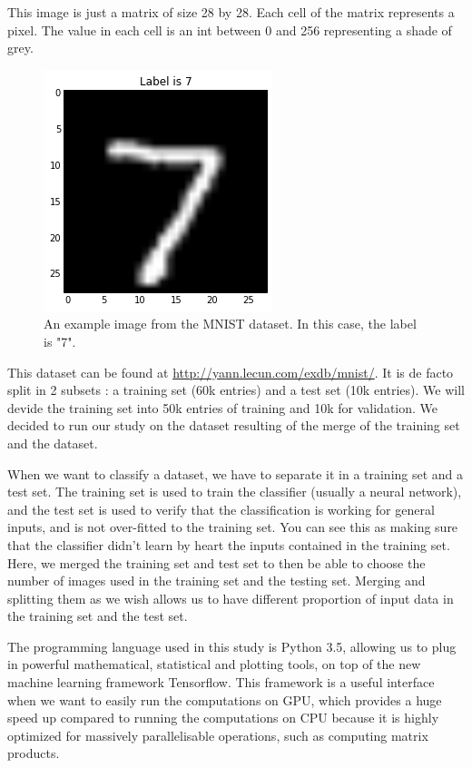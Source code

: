 \documentclass[11pt,a4paper]{article}
\begin{document}
	This image is just a matrix of size 28 by 28. Each cell of the matrix represents a pixel. The value in each cell is an int between 0 and 256 representing a shade of grey.
	
		\begin{figure}
			\centering
			\includegraphics[scale=0.7]{img/gYsJp.png}
			\caption{An example image from the MNIST dataset. In this case, the label is "7".}
			\label{img:example_mnist_img}
		\end{figure}
		
	
	This dataset can be found at \url{http://yann.lecun.com/exdb/mnist/}. It is de facto split in 2 subsets : a training set (60k entries) and a test set (10k entries). We will devide the training set into 50k entries of training and 10k for validation. We decided to run our study on the dataset resulting of the merge of the training set and the dataset.
	

	When we want to classify a dataset, we have to separate it in a training set and a test set. The training set is used to train the classifier (usually a neural network), and the test set is used to verify that the classification is working for general inputs, and is not over-fitted to the training set. You can see this as making sure that the classifier didn't learn by heart the inputs contained in the training set.
	Here, we merged the training set and test set to then be able to choose the number of images used in the training set and the testing set. Merging and splitting them as we wish allows us to have different proportion of input data in the training set and the test set.
	
	The programming language used in this study is Python 3.5, allowing us to plug in powerful mathematical, statistical and plotting tools, on top of the new machine learning framework Tensorflow.
	This framework is a useful interface when we want to easily run the computations on GPU, which provides a huge speed up compared to running the computations on CPU because it is highly optimized for massively parallelisable operations, such as computing matrix products. 
	
\end{document}

